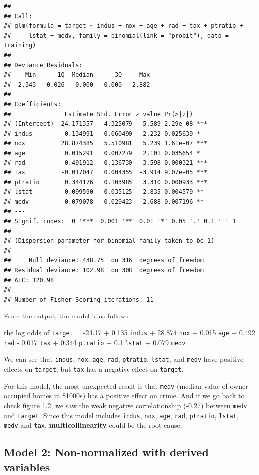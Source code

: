 \documentclass[]{article}
\begin{document}
\begin{verbatim}
## 
## Call:
## glm(formula = target ~ indus + nox + age + rad + tax + ptratio + 
##     lstat + medv, family = binomial(link = "probit"), data = training)
## 
## Deviance Residuals: 
##    Min      1Q  Median      3Q     Max  
## -2.343  -0.026   0.000   0.000   2.882  
## 
## Coefficients:
##               Estimate Std. Error z value Pr(>|z|)    
## (Intercept) -24.171357   4.325079  -5.589 2.29e-08 ***
## indus         0.134991   0.060490   2.232 0.025639 *  
## nox          28.874385   5.510981   5.239 1.61e-07 ***
## age           0.015291   0.007279   2.101 0.035654 *  
## rad           0.491912   0.136730   3.598 0.000321 ***
## tax          -0.017047   0.004355  -3.914 9.07e-05 ***
## ptratio       0.344176   0.103985   3.310 0.000933 ***
## lstat         0.099590   0.035125   2.835 0.004579 ** 
## medv          0.079078   0.029423   2.688 0.007196 ** 
## ---
## Signif. codes:  0 '***' 0.001 '**' 0.01 '*' 0.05 '.' 0.1 ' ' 1
## 
## (Dispersion parameter for binomial family taken to be 1)
## 
##     Null deviance: 438.75  on 316  degrees of freedom
## Residual deviance: 102.98  on 308  degrees of freedom
## AIC: 120.98
## 
## Number of Fisher Scoring iterations: 11
\end{verbatim}

From the output, the model is as follows:

the log odds of \texttt{target} = -24.17 + 0.135 \texttt{indus} + 28.874
\texttt{nox} + 0.015 \texttt{age} + 0.492 \texttt{rad} - 0.017
\texttt{tax} + 0.344 \texttt{ptratio} + 0.1 \texttt{lstat} + 0.079
\texttt{medv}

We can see that \texttt{indus}, \texttt{nox}, \texttt{age},
\texttt{rad}, \texttt{ptratio}, \texttt{lstat}, and \texttt{medv} have
positive effects on \texttt{target}, but \texttt{tax} has a negative
effect on \texttt{target}.

For this model, the most unexpected result is that \texttt{medv} (median
value of owner-occupied homes in \$1000s) has a positive effect on
crime. And if we go back to check figure 1.2, we saw the weak negative
correlationship (-0.27) between \texttt{medv} and \texttt{target}. Since
this model includes \texttt{indus}, \texttt{nox}, \texttt{age},
\texttt{rad}, \texttt{ptratio}, \texttt{lstat}, \texttt{medv} and
\texttt{tax}, \textbf{multicollinearity} could be the root cause.

\subsection{Model 2: Non-normalized with derived
variables}\label{model-2-non-normalized-with-derived-variables}
\end{document}
